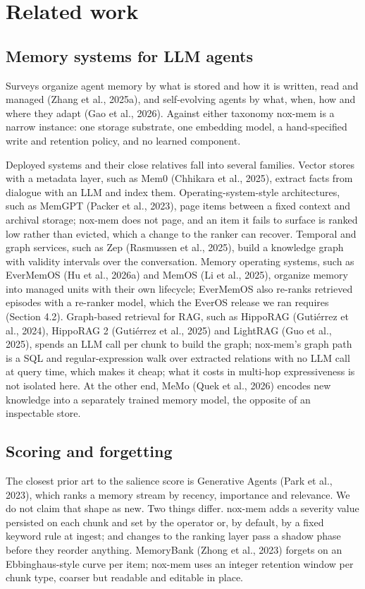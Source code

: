 \documentclass[a4paper,fleqn]{cas-sc}
\begin{document}
\section{Related work}

\subsection{Memory systems for LLM agents}

Surveys organize agent memory by what is stored and how it is written, read and managed (Zhang et al., 2025a), and self-evolving agents by what, when, how and where they adapt (Gao et al., 2026). Against either taxonomy nox-mem is a narrow instance: one storage substrate, one embedding model, a hand-specified write and retention policy, and no learned component.

Deployed systems and their close relatives fall into several families. Vector stores with a metadata layer, such as Mem0 (Chhikara et al., 2025), extract facts from dialogue with an LLM and index them. Operating-system-style architectures, such as MemGPT (Packer et al., 2023), page items between a fixed context and archival storage; nox-mem does not page, and an item it fails to surface is ranked low rather than evicted, which a change to the ranker can recover. Temporal and graph services, such as Zep (Rasmussen et al., 2025), build a knowledge graph with validity intervals over the conversation. Memory operating systems, such as EverMemOS (Hu et al., 2026a) and MemOS (Li et al., 2025), organize memory into managed units with their own lifecycle; EverMemOS also re-ranks retrieved episodes with a re-ranker model, which the EverOS release we ran requires (Section 4.2). Graph-based retrieval for RAG, such as HippoRAG (Gutiérrez et al., 2024), HippoRAG 2 (Gutiérrez et al., 2025) and LightRAG (Guo et al., 2025), spends an LLM call per chunk to build the graph; nox-mem's graph path is a SQL and regular-expression walk over extracted relations with no LLM call at query time, which makes it cheap; what it costs in multi-hop expressiveness is not isolated here. At the other end, MeMo (Quek et al., 2026) encodes new knowledge into a separately trained memory model, the opposite of an inspectable store.

\subsection{Scoring and forgetting}

The closest prior art to the salience score is Generative Agents (Park et al., 2023), which ranks a memory stream by recency, importance and relevance. We do not claim that shape as new. Two things differ. nox-mem adds a severity value persisted on each chunk and set by the operator or, by default, by a fixed keyword rule at ingest; and changes to the ranking layer pass a shadow phase before they reorder anything. MemoryBank (Zhong et al., 2023) forgets on an Ebbinghaus-style curve per item; nox-mem uses an integer retention window per chunk type, coarser but readable and editable in place.
\end{document}
